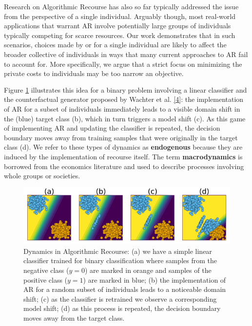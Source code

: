 \documentclass[conference,final,]{IEEEtran}
\theoremstyle{definition}
\theoremstyle{definition}
\theoremstyle{definition}
\theoremstyle{definition}
\theoremstyle{remark}
\begin{document}
Research on Algorithmic Recourse has also so far typically addressed the issue from the perspective of a single individual. Arguably though, most real-world applications that warrant AR involve potentially large groups of individuals typically competing for scarce resources. Our work demonstrates that in such scenarios, choices made by or for a single individual are likely to affect the broader collective of individuals in ways that many current approaches to AR fail to account for. More specifically, we argue that a strict focus on minimizing the private costs to individuals may be too narrow an objective.

Figure \ref{fig:poc} illustrates this idea for a binary problem involving a linear classifier and the counterfactual generator proposed by Wachter et al. \protect\hyperlink{ref-wachter2017counterfactual}{{[}4{]}}: the implementation of AR for a subset of individuals immediately leads to a visible domain shift in the (blue) target class (b), which in turn triggers a model shift (c). As this game of implementing AR and updating the classifier is repeated, the decision boundary moves away from training samples that were originally in the target class (d). We refer to these types of dynamics as \textbf{endogenous} because they are induced by the implementation of recourse itself. The term \textbf{macrodynamics} is borrowed from the economics literature and used to describe processes involving whole groups or societies.

\begin{figure}

{\centering \includegraphics[width=0.9\linewidth]{www/poc} 

}

\caption{Dynamics in Algorithmic Recourse: (a) we have a simple linear classifier trained for binary classification where samples from the negative class ($y=0$) are marked in orange and samples of the positive class ($y=1$) are marked in blue; (b) the implementation of AR for a random subset of individuals leads to a noticeable domain shift; (c) as the classifier is retrained we observe a corresponding model shift; (d) as this process is repeated, the decision boundary moves away from the target class.}\label{fig:poc}
\end{figure}
\end{document}
